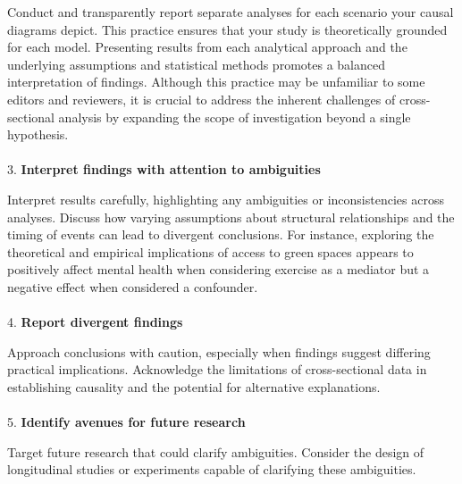 \documentclass[
  single column]{article}
\makeatletter
\let\oldparagraph\paragraph
\renewcommand{\paragraph}{
    \@ifstar
      \xxxParagraphStar
      \xxxParagraphNoStar
  }
\newcommand{\xxxParagraphStar}[1]{\oldparagraph*{#1}\mbox{}}
\newcommand{\xxxParagraphNoStar}[1]{\oldparagraph{#1}\mbox{}}
\makeatother
\begin{document}
Conduct and transparently report separate analyses for each scenario
your causal diagrams depict. This practice ensures that your study is
theoretically grounded for each model. Presenting results from each
analytical approach and the underlying assumptions and statistical
methods promotes a balanced interpretation of findings. Although this
practice may be unfamiliar to some editors and reviewers, it is crucial
to address the inherent challenges of cross-sectional analysis by
expanding the scope of investigation beyond a single hypothesis.

\paragraph{\texorpdfstring{3. \textbf{Interpret findings with attention
to
ambiguities}}{3. Interpret findings with attention to ambiguities}}\label{interpret-findings-with-attention-to-ambiguities}

Interpret results carefully, highlighting any ambiguities or
inconsistencies across analyses. Discuss how varying assumptions about
structural relationships and the timing of events can lead to divergent
conclusions. For instance, exploring the theoretical and empirical
implications of access to green spaces appears to positively affect
mental health when considering exercise as a mediator but a negative
effect when considered a confounder.

\paragraph{\texorpdfstring{4. \textbf{Report divergent
findings}}{4. Report divergent findings}}\label{report-divergent-findings}

Approach conclusions with caution, especially when findings suggest
differing practical implications. Acknowledge the limitations of
cross-sectional data in establishing causality and the potential for
alternative explanations.

\paragraph{\texorpdfstring{5. \textbf{Identify avenues for future
research}}{5. Identify avenues for future research}}\label{identify-avenues-for-future-research}

Target future research that could clarify ambiguities. Consider the
design of longitudinal studies or experiments capable of clarifying
these ambiguities.
\end{document}
